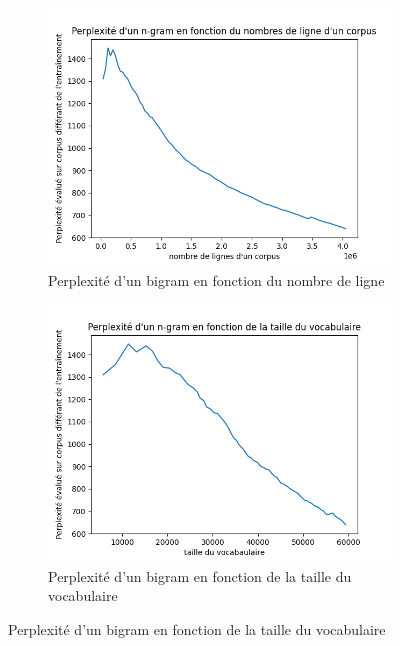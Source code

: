 \documentclass[a4paper]{article}
\begin{document}
\begin{figure}[!ht]
    \begin{subfigure}{0.47\textwidth}
        \includegraphics[width=\linewidth]{../results/balzac_result/balzac_2_lines.png}
        \caption{Perplexité d'un bigram en fonction du nombre de ligne}
      \end{subfigure}
      \hfill
      \begin{subfigure}{0.47\textwidth}
        \includegraphics[width=\linewidth]{../results/balzac_result/balzac_2_vocab_size.png}
        \caption{Perplexité d'un bigram en fonction de la taille du vocabulaire}
      \end{subfigure}


\end{figure}
\end{document}
